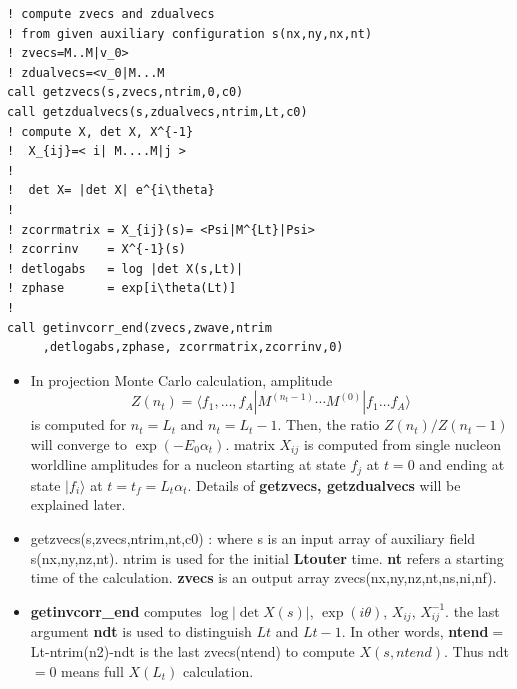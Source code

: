 \documentclass[10pt]{book}
\def\la{\langle}
\def\ra{\rangle}
\begin{document}
\begin{lstlisting}[frame=single]
! compute zvecs and zdualvecs 
! from given auxiliary configuration s(nx,ny,nx,nt) 
! zvecs=M..M|v_0>
! zdualvecs=<v_0|M...M
call getzvecs(s,zvecs,ntrim,0,c0)
call getzdualvecs(s,zdualvecs,ntrim,Lt,c0)
! compute X, det X, X^{-1}
!  X_{ij}=< i| M....M|j >
!
!  det X= |det X| e^{i\theta}
!
! zcorrmatrix = X_{ij}(s)= <Psi|M^{Lt}|Psi>
! zcorrinv    = X^{-1}(s)
! detlogabs   = log |det X(s,Lt)|
! zphase      = exp[i\theta(Lt)]
!
call getinvcorr_end(zvecs,zwave,ntrim
     ,detlogabs,zphase, zcorrmatrix,zcorrinv,0)
\end{lstlisting}
\begin{itemize}
	\item In projection Monte Carlo calculation, amplitude
	$$ Z(n_t)=\la f_1,\dots ,f_A| M^{(n_t-1)}\cdots M^{(0)}|f_1\dots f_A\ra $$
	is computed for $n_t=L_t$ and $n_t=L_t-1$. Then, the ratio $ Z(n_t)/Z(n_t-1)$
	will converge to $\exp(-E_0 \alpha_t)$. matrix $X_{ij}$ is computed from single nucleon 
	worldline amplitudes for a nucleon starting at state $f_j$ at $t=0$
	and ending at state $|f_i\ra$ at $t=t_f=L_t \alpha_t$. 
	{\color{red} Details of {\bf getzvecs, getzdualvecs} will be explained later.} 
	\item getzvecs(s,zvecs,ntrim,nt,c0) : where s is an input array of auxiliary field s(nx,ny,nz,nt).
	 ntrim is used for the initial {\bf Ltouter} time. {\bf nt} refers a starting time of the 
	 calculation. {\bf zvecs} is an output array zvecs(nx,ny,nz,nt,ns,ni,nf).  
	\item {\bf getinvcorr\_end} computes $\log|\det X(s)|$, $\exp(i\theta)$, $X_{ij}$, $X^{-1}_{ij}$. 
	the last argument {\bf ndt} is used to distinguish $Lt$ and $Lt-1$. 
	In other words, {\bf ntend}$=$Lt-ntrim(n2)-ndt is the last zvecs(ntend) to compute $X(s,ntend)$.
	Thus ndt$=$0 means full $X(L_t)$ calculation.
\end{itemize}
\end{document}
